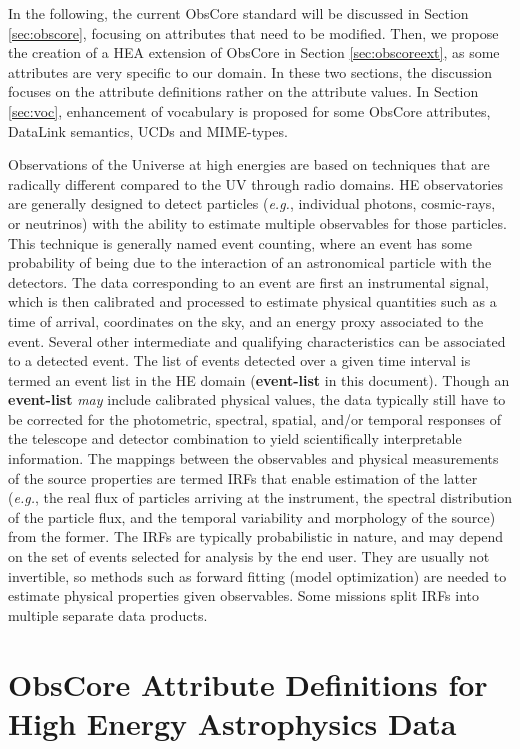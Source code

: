 \documentclass[11pt,a4paper]{ivoa}
\begin{document}
In the following, the current ObsCore standard will be discussed in Section \ref{sec:obscore}, focusing on attributes that need to be modified. Then, we propose the creation of a \gls{HEA} extension of ObsCore in Section \ref{sec:obscoreext}, as some attributes are very specific to our domain. In these two sections, the discussion focuses on the attribute definitions rather on the attribute values. In Section \ref{sec:voc}, enhancement of vocabulary is proposed for some ObsCore attributes, DataLink semantics, UCDs and MIME-types.




Observations of the Universe at high energies are based on techniques that are radically different compared to the UV through radio domains. HE observatories are generally designed to detect particles ({\em e.g.\/}, individual photons, cosmic-rays, or neutrinos) with the ability to estimate multiple observables for those particles. This technique is generally named event counting, where an event has some probability of being due to the interaction of an astronomical particle with the detectors. The data corresponding to an event are first an instrumental signal, which is then calibrated and processed to estimate physical quantities such as a time of arrival, coordinates on the sky, and an energy proxy associated to the event. Several other intermediate and qualifying characteristics can be associated to a detected event.  The list of events detected over a given time interval is termed an event list in the HE domain ({\bf event-list} in this document). Though an {\bf event-list} {\em may\/} include calibrated physical values, the data typically still have to be corrected for the photometric, spectral, spatial, and/or temporal responses of the telescope and detector combination to yield scientifically interpretable information. The mappings between the observables and physical measurements of the source properties are termed \glspl{IRF} that enable estimation of the latter ({\em e.g.\/}, the real flux of particles arriving at the instrument, the spectral distribution of the particle flux, and the temporal variability and morphology of the source) from the former. The \glspl{IRF} are typically probabilistic in nature, and may depend on the set of events selected for analysis by the end user. They are usually not invertible, so methods such as forward fitting (model optimization) are needed to estimate physical properties given observables.  Some missions split IRFs into multiple separate data products.


\section{ObsCore Attribute Definitions for High Energy Astrophysics Data}
\end{document}

